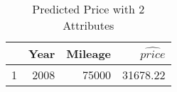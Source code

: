 \begin{table}[ht]
\centering
\begin{tabular}{rrrr}
  \hline
 & Year & Mileage & $\widehat{price}$ \\ 
  \hline
1 & 2008 & 75000 & 31678.22 \\ 
   \hline
\end{tabular}
\caption{Predicted Price with 2 Attributes} 
\label{tab:2p_predict}
\end{table}
